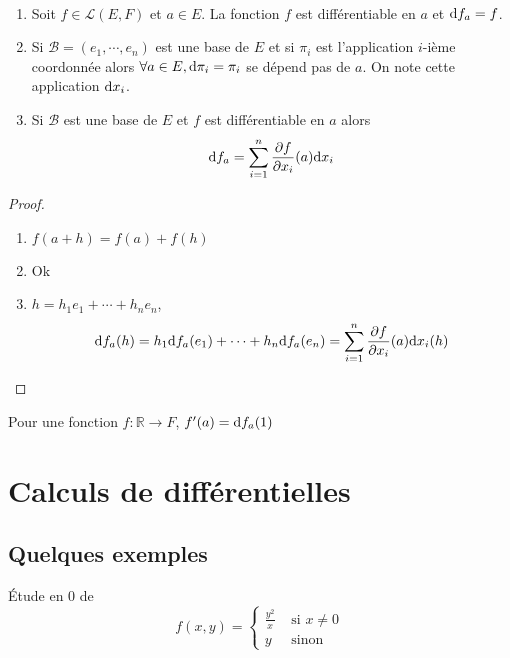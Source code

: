 \begin{thmdef}
    ~ \begin{enumerate}
        \item Soit $f\in\mathcal L(E, F)$ et $a\in E$. La fonction $f$ est différentiable en $a$ et $\mathrm{d} f_a=f$.
        \item Si $\mathcal B=(e_1, \cdots, e_n)$ est une base de $E$ et si $\pi_i$ est l'application $i$-ième coordonnée alors $\forall a\in E, \mathrm{d} \pi_i=\pi_i$ se dépend pas de $a$. On note cette application $\mathrm{d} x_i$.
        \item Si $\mathcal B$ est une base de $E$ et $f$ est différentiable en $a$ alors \[
                \mathrm{d} f_a=\sum_{i=1}^n\frac{\partial f}{\partial x_i}(a)\mathrm{d} x_i
            \]
    \end{enumerate}
\end{thmdef}

\begin{proof} ~
    \begin{enumerate}
        \item $f(a+h)=f(a)+f(h)$
        \item Ok
        \item $h=h_1e_1+\cdots +h_ne_n$, \[
                \mathrm{d} f_a(h)=h_1\mathrm{d} f_a(e_1)+\cdots +h_n\mathrm{d} f_a(e_n)=\sum_{i=1}^n\frac{\partial f}{\partial x_i}(a)\mathrm{d} x_i(h)
            \]
    \end{enumerate}
\end{proof}

\begin{rem}
    Pour une fonction $f:\mathbb R\longrightarrow F$, $f'(a)=\mathrm{d} f_a(1)$
\end{rem}

\section{Calculs de différentielles}

\subsection{Quelques exemples}
\begin{ex} Étude en $0$ de
    \[
        f(x, y)=\begin{cases}
            \frac{y^2}x &\text{ si }x\neq 0\\ y & \text{ sinon}
        \end{cases}
    \]
\end{ex}

